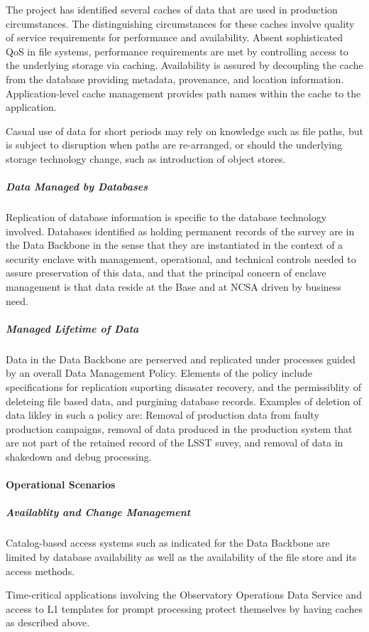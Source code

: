 The project has identified several caches of data that are used in production circumstances.
The distinguishing circumstances for these caches involve quality of service requirements for
performance and availability. Absent sophisticated QoS in file systems, performance requirements
are met by controlling access to the underlying storage via caching. Availability is assured by
decoupling the cache from the database providing metadata, provenance, and location information.
Application-level cache management provides path names within the cache to the application.

Casual use of data for short periods may rely on knowledge such as file paths, but is subject
to disruption when paths are re-arranged, or should the underlying storage technology change,
such as introduction of object stores.


\subparagraph{Data Managed by Databases}

Replication of database information is specific to the database technology involved.
Databases identified as holding permanent records of the survey are in the Data Backbone
in the sense that they are instantiated in the context of a security enclave with management,
operational, and technical controls needed to assure preservation of this data, and that the
principal concern of enclave management is that data reside at the Base and at NCSA
driven by business need.

\subparagraph{Managed Lifetime of Data}
Data in the Data Backbone are perserved and replicated under processes
guided by an overall Data Management Policy.  Elements of the policy
include specifications for replication suporting disasater recovery,
and the permissiblity of deleteing file based data, and purgining
database records.  Examples of deletion of data likley in such a
policy are: Removal of production data from faulty production campaigns,
removal of data produced in the production system that are not part
of the retained record of the LSST suvey, and removal of data in
shakedown and debug processing.

\paragraph{Operational Scenarios}

\subparagraph{Availablity and Change Management}

Catalog-based access systems such as indicated for the Data Backbone are
limited by database availability as well as the availability of the file
store and its access methods.

Time-critical applications involving the Observatory Operations Data
Service and access to L1 templates for prompt processing protect
themselves by having caches as described above.
